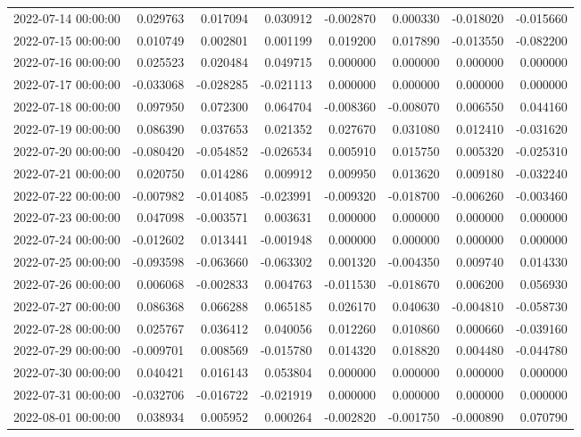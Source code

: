 \begin{tabular}{lrrrrrrr}
2022-07-14 00:00:00 & 0.029763 & 0.017094 & 0.030912 & -0.002870 & 0.000330 & -0.018020 & -0.015660 \\
2022-07-15 00:00:00 & 0.010749 & 0.002801 & 0.001199 & 0.019200 & 0.017890 & -0.013550 & -0.082200 \\
2022-07-16 00:00:00 & 0.025523 & 0.020484 & 0.049715 & 0.000000 & 0.000000 & 0.000000 & 0.000000 \\
2022-07-17 00:00:00 & -0.033068 & -0.028285 & -0.021113 & 0.000000 & 0.000000 & 0.000000 & 0.000000 \\
2022-07-18 00:00:00 & 0.097950 & 0.072300 & 0.064704 & -0.008360 & -0.008070 & 0.006550 & 0.044160 \\
2022-07-19 00:00:00 & 0.086390 & 0.037653 & 0.021352 & 0.027670 & 0.031080 & 0.012410 & -0.031620 \\
2022-07-20 00:00:00 & -0.080420 & -0.054852 & -0.026534 & 0.005910 & 0.015750 & 0.005320 & -0.025310 \\
2022-07-21 00:00:00 & 0.020750 & 0.014286 & 0.009912 & 0.009950 & 0.013620 & 0.009180 & -0.032240 \\
2022-07-22 00:00:00 & -0.007982 & -0.014085 & -0.023991 & -0.009320 & -0.018700 & -0.006260 & -0.003460 \\
2022-07-23 00:00:00 & 0.047098 & -0.003571 & 0.003631 & 0.000000 & 0.000000 & 0.000000 & 0.000000 \\
2022-07-24 00:00:00 & -0.012602 & 0.013441 & -0.001948 & 0.000000 & 0.000000 & 0.000000 & 0.000000 \\
2022-07-25 00:00:00 & -0.093598 & -0.063660 & -0.063302 & 0.001320 & -0.004350 & 0.009740 & 0.014330 \\
2022-07-26 00:00:00 & 0.006068 & -0.002833 & 0.004763 & -0.011530 & -0.018670 & 0.006200 & 0.056930 \\
2022-07-27 00:00:00 & 0.086368 & 0.066288 & 0.065185 & 0.026170 & 0.040630 & -0.004810 & -0.058730 \\
2022-07-28 00:00:00 & 0.025767 & 0.036412 & 0.040056 & 0.012260 & 0.010860 & 0.000660 & -0.039160 \\
2022-07-29 00:00:00 & -0.009701 & 0.008569 & -0.015780 & 0.014320 & 0.018820 & 0.004480 & -0.044780 \\
2022-07-30 00:00:00 & 0.040421 & 0.016143 & 0.053804 & 0.000000 & 0.000000 & 0.000000 & 0.000000 \\
2022-07-31 00:00:00 & -0.032706 & -0.016722 & -0.021919 & 0.000000 & 0.000000 & 0.000000 & 0.000000 \\
2022-08-01 00:00:00 & 0.038934 & 0.005952 & 0.000264 & -0.002820 & -0.001750 & -0.000890 & 0.070790 \\

\end{tabular}
